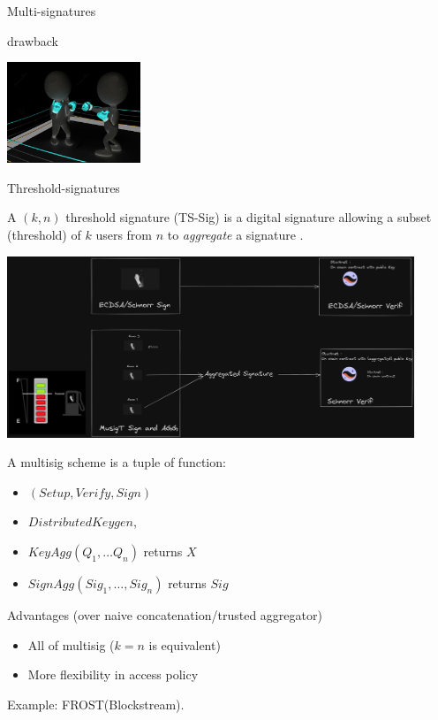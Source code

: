 \documentclass[aspectratio=43]{beamer}
\begin{document}
\begin{frame}{Multi-signatures}
{\begin{alertblock}{drawback}
\begin{itemize}
\begin{center}
  \includegraphics[width=4cm]{images/rounds.jpg}
  \end{center}
  \end{itemize}
  \end{alertblock}
  } 
 
 \end{frame}
 

 
\begin{frame}{Threshold-signatures}


 A $(k,n)$ threshold signature (TS-Sig) is a digital signature allowing a subset (threshold) of $k$ users from $n$ to {\it aggregate} a signature . 
 
  {
   \begin{center}
        \includegraphics[width=12.2cm]{images/threshold.png}
        \end{center}
  }
  {
    \begin{definition}
     A multisig scheme is a tuple of function:
     \begin{itemize}
     \item $(Setup,  Verify, Sign)$
     \item $Distributed Keygen$,
     \item $KeyAgg(Q_1, \ldots Q_n)$ returns $X$
     \item $SignAgg(Sig_1, \ldots, Sig_n)$ returns $Sig$
     \end{itemize}
  \end{definition}
     
      {
      
  \begin{exampleblock}{Advantages (over naive concatenation/trusted aggregator)}
  \begin{itemize}
  \item All of multisig ($k=n$ is equivalent)
  \item More flexibility in access policy
  \end{itemize}
  \end{exampleblock}
 
  } 
   Example: FROST(Blockstream).
 }
\end{frame}
\end{document}
